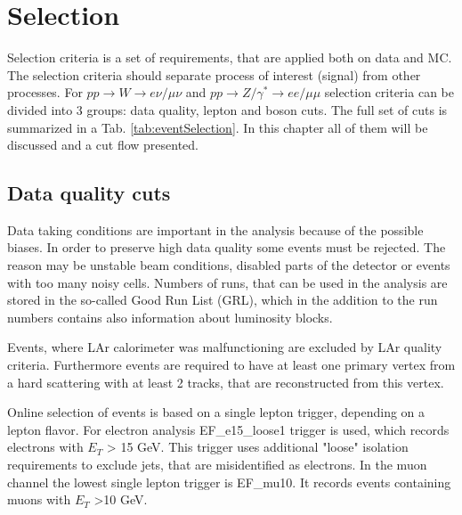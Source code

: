 \chapter{Selection}\label{chap:EventSelection}

Selection criteria is a set of requirements, that are applied both on data and MC. The selection criteria should  separate process of interest (signal) from other processes. For $pp \to W \to e\nu/\mu\nu$ and $pp \to Z/\gamma^* \to ee/\mu\mu$ selection criteria can be divided into 3 groups: data quality, lepton and boson cuts. The full set of cuts is summarized in a Tab. \ref{tab:eventSelection}. In this chapter all of them will be discussed and a cut flow presented. 
\section{Data quality cuts}




Data taking conditions are important in the analysis because of the possible biases. In order to preserve high data quality some events must be rejected. The reason may be unstable beam conditions, disabled parts of the detector or events with too many noisy cells. Numbers of runs, that can be used in the analysis are stored in the so-called Good Run List (GRL), which in the addition to the run numbers contains also information about luminosity blocks. 

Events, where LAr calorimeter was malfunctioning are excluded by LAr quality criteria. Furthermore events are required to have at least one primary vertex from a hard scattering with at least 2 tracks, that are reconstructed from this vertex. 

Online selection of events is based on a single lepton trigger, depending on a lepton flavor. For electron analysis EF\_e15\_loose1 trigger is used, which records electrons with $E_T$ > 15 GeV. This trigger uses additional "loose" isolation requirements to exclude jets, that are misidentified as electrons. In the muon channel the lowest single lepton trigger is EF\_mu10.  It records events containing muons with $E_T$ >10 GeV.


